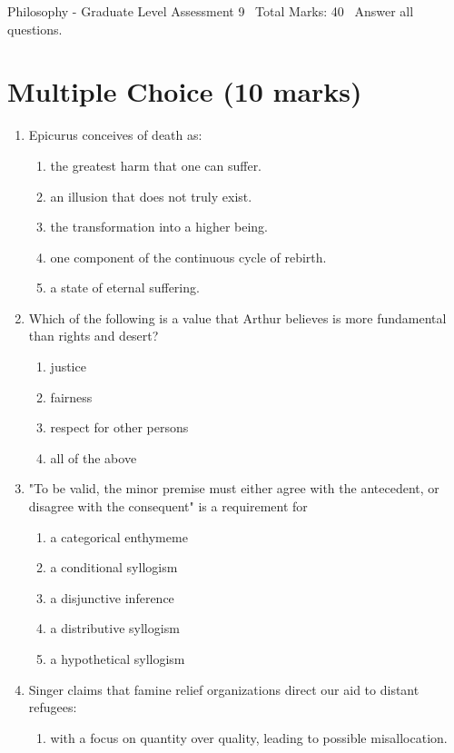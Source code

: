 \documentclass[12pt]{article}
\begin{document}
\begin{center}
Philosophy - Graduate Level Assessment 9 \
Total Marks: 40 \
Answer all questions.
\end{center}

\section*{Multiple Choice (10 marks)}
\begin{enumerate}[label=\arabic*.]
\item Epicurus conceives of death as:
\begin{enumerate}[label=(\alph*)]
    \item the greatest harm that one can suffer.
    \item an illusion that does not truly exist.
    \item the transformation into a higher being.
    \item one component of the continuous cycle of rebirth.
    \item a state of eternal suffering.
\end{enumerate}
\item Which of the following is a value that Arthur believes is more fundamental than rights and desert?
\begin{enumerate}[label=(\alph*)]
    \item justice
    \item fairness
    \item respect for other persons
    \item all of the above
\end{enumerate}
\item "To be valid, the minor premise must either agree with the antecedent, or disagree with the consequent" is a requirement for
\begin{enumerate}[label=(\alph*)]
    \item a categorical enthymeme
    \item a conditional syllogism
    \item a disjunctive inference
    \item a distributive syllogism
    \item a hypothetical syllogism
\end{enumerate}
\item Singer claims that famine relief organizations direct our aid to distant refugees:
\begin{enumerate}[label=(\alph*)]
    \item with a focus on quantity over quality, leading to possible misallocation.

\end{enumerate}
\end{enumerate}
\end{document}
